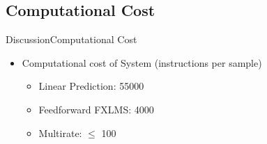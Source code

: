 \subsection{Computational Cost}

\begin{frame}{Discussion}{Computational Cost}		
\begin{itemize}
\item Computational cost of System (instructions per sample)
	\begin{itemize}
		\item Linear Prediction: 55000 
		\item Feedforward FXLMS: 4000 
		\item Multirate: $\leq$ 100
	\end{itemize}
\end{itemize}

\end{frame}
